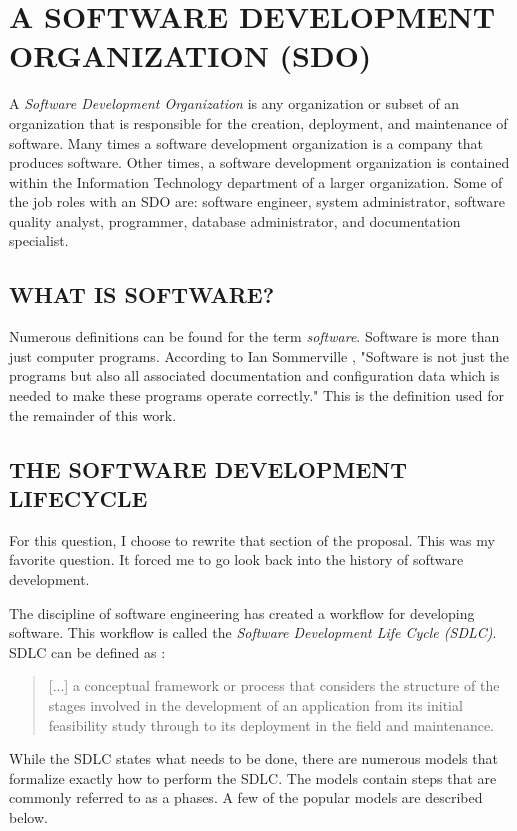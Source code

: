 \documentclass[SDSUThesis.tex]{subfiles}
\begin{document}
\section{A SOFTWARE DEVELOPMENT ORGANIZATION (SDO)}
A \textit{Software Development Organization} is any organization or subset of an organization that is responsible
for the creation, deployment, and maintenance of software.  Many times a software development organization
is a company that produces software.  Other times, a software development organization is contained
within the Information Technology department of a larger organization. Some of the job roles
with an SDO are: software engineer, system administrator, software quality analyst,
programmer, database administrator, and documentation specialist.


\subsection{WHAT IS SOFTWARE?}
Numerous definitions can be found for the term \textit{software}.
Software is more than just computer programs. According to Ian Sommerville \cite{Sommerville2001}, 
"Software is not just the programs but also all associated documentation and configuration data which is needed to make these programs operate correctly."
This is the definition used for the remainder of this work.


\subsection{THE SOFTWARE DEVELOPMENT LIFECYCLE}
    For this question, I choose to rewrite that section of the proposal.  This was
    my favorite question. It forced me to go look back into the history of
    software development. 
    
    The discipline of software engineering has created a workflow for developing
    software.  
    This workflow is called the \textit{Software Development Life Cycle (SDLC)}.
    SDLC can be defined as \cite{Ruparelia2010}:
    \begin{quote}
     [...] a conceptual framework or process that considers the structure of the stages
     involved in the development of an application from its initial feasibility study
     through to its deployment in the field and maintenance.
    \end{quote}
    While the SDLC states what needs to be done, there are numerous models 
    that formalize exactly how to perform the SDLC.  The models contain
    steps that are commonly referred to as a phases. A few of the popular
    models are described below.
    
\end{document}
